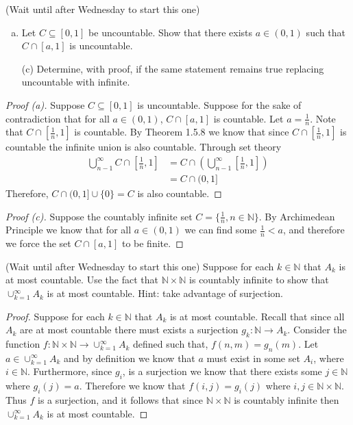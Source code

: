\documentclass[12pt]{article}
\makeatletter
\theoremstyle{homework}
\newenvironment{exercise}[1]
{\def\@currentlabel{#1}\exercisecore}
{\endexercisecore}
\newcommand{\Nats}{\ensuremath{\mathbb N}}
\makeatother
\begin{document}
\begin{exercise}{1.5.10 (a) (c)}
(Wait until after Wednesday to start this one)
\begin{enumerate}[(a)] 
	
\item Let $C\subseteq[0,1]$ be uncountable.  Show that
there exists $a\in(0,1)$ such that $C\cap [a,1]$ is uncountable.
\item[(c)] Determine, with proof, if the same statement remains
true replacing uncountable with infinite.
\end{enumerate}
\end{exercise}
\begin{proof}[Proof (a)] Suppose $C \subseteq [0,1]$ is uncountable. Suppose for the sake of contradiction that for all $a \in (0,1)$,
  $C \cap [a,1]$ is countable. Let $a = \frac{1}{n}$. Note that $C \cap [\frac{1}{n},1]$ is countable.  By Theorem 1.5.8 we know that since $C \cap [\frac{1}{n},1]$ is countable the infinite union is also countable. Through set theory
  \begin{align*}
    \bigcup_{n - 1}^{\infty} C \cap [\frac{1}{n},1] &= C \cap (\bigcup_{n - 1}^{\infty} [\frac{1}{n},1])\\
    &=  C \cap (0,1]
  \end{align*}
Therefore, $C \cap (0,1] \cup \{0\} = C$ is also countable. 
\end{proof}
\begin{proof}[Proof (c)] Suppose the countably infinite set $C = \{\frac{1}{n}, n \in \Nats\}$. By Archimedean Principle we know that 
  for all $a \in (0,1)$ we can find some $\frac{1}{n}<a$, and therefore we force the set $C \cap [a, 1]$ to be finite. 




\end{proof}

\begin{exercise}{Supplemental 3}
(Wait until after Wednesday to start this one)
Suppose for each $k\in\Nats$ that $A_k$ is at most countable.
Use the fact that $\Nats\times\Nats$ is countably infinite to
show that $\cup_{k=1}^\infty A_k$ is at most countable.  Hint:
take advantage of surjection.
\end{exercise}
\begin{proof}
  Suppose for each $k\in\Nats$ that $A_k$ is at most countable. Recall that since all $A_k$ are at most countable there must exists a surjection $g_k: \Nats \to A_k$.  Consider the function $f: \Nats\times\Nats \to \cup_{k=1}^\infty A_k$ defined such that,
  $f(n,m) = g_n(m)$. Let $a \in \cup_{k=1}^\infty A_k$ and by definition we know that $a$ must exist in some set $A_i$, where $i \in \Nats$. Furthermore, since $g_i$, is a surjection we know that there exists some $j \in \Nats$ where $g_i(j) = a$. Therefore we know that $f(i,j) = g_i(j)$ where $i,j \in \Nats\times\Nats$. Thus $f$ is a surjection, and it follows that since
   $\Nats\times\Nats$ is countably infinite then $ \cup_{k=1}^\infty A_k$ is at most countable. 
\end{proof}
\end{document}
